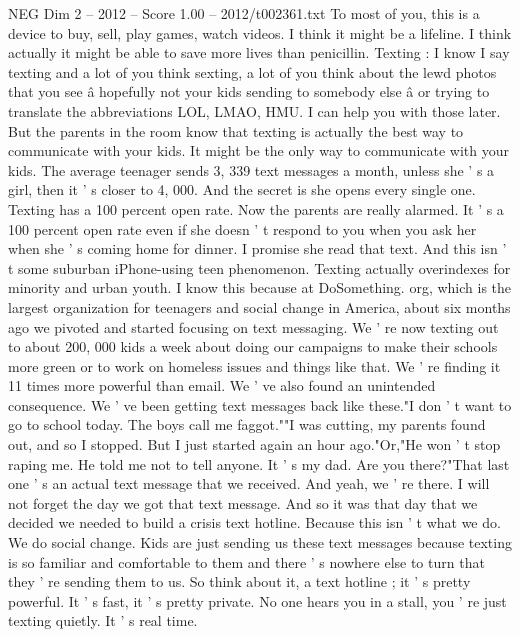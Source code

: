 \begin{textsample}{NEG Dim 2 – 2012 – Score 1.00 – 2012/t002361.txt}  \label{ex:f2_neg_027}
To most of you, this is a device to buy, sell, play games, watch videos.
I think it might be a lifeline.
I think actually it might be able to save more lives than penicillin.
Texting : I know I say texting and a lot of you think sexting, a lot of you think about the lewd photos that you see â hopefully not your kids sending to somebody else â or trying to translate the abbreviations LOL, LMAO, HMU.
I can help you with those later.
But the parents in the room know that texting is actually the best way to communicate with your kids.
It might be the only way to communicate with your kids.
The average teenager sends 3, 339 text messages a month, unless she ' s a girl, then it ' s closer to 4, 000.
And the secret is she opens every single one.
Texting has a 100 percent open rate.
Now the parents are really alarmed.
It ' s a 100 percent open rate even if she doesn ' t respond to you when you ask her when she ' s coming home for dinner.
I promise she read that text.
And this isn ' t some suburban iPhone-using teen phenomenon.
Texting actually overindexes for minority and urban youth.
I know this because at DoSomething. org, which is the largest organization for teenagers and social change in America, about six months ago we pivoted and started focusing on text messaging.
We ' re now texting out to about 200, 000 kids a week about doing our campaigns to make their schools more green or to work on homeless issues and things like that.
We ' re finding it 11 times more powerful than email.
We ' ve also found an unintended consequence.
We ' ve been getting text messages back like these."I don ' t want to go to school today.
The boys call me faggot.""I was cutting, my parents found out, and so I stopped.
But I just started again an hour ago."Or,"He won ' t stop raping me.
He told me not to tell anyone.
It ' s my dad.
Are you there?"That last one ' s an actual text message that we received.
And yeah, we ' re there.
I will not forget the day we got that text message.
And so it was that day that we decided we needed to build a crisis text hotline.
Because this isn ' t what we do.
We do social change.
Kids are just sending us these text messages because texting is so familiar and comfortable to them and there ' s nowhere else to turn that they ' re sending them to us.
So think about it, a text hotline ; it ' s pretty powerful.
It ' s fast, it ' s pretty private.
No one hears you in a stall, you ' re just texting quietly.
It ' s real time.

\end{textsample}

